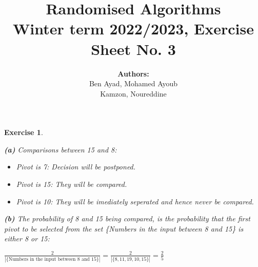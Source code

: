 \documentclass{article}
\title{Randomised Algorithms \\
Winter term 2022/2023, Exercise Sheet No. 3}
\author{
    \textbf{Authors:} \\
    Ben Ayad, Mohamed Ayoub \\
    Kamzon, Noureddine
}
\newtheorem{exo}{Exercise}
\begin{document}
\maketitle


\begin{exo}{\ \\}

\noindent
\textbf{(a)} Comparisons between 15 and 8:
\begin{itemize}
    \item Pivot is 7: Decision will be postponed.
    \item Pivot is 15: They will be compared.
    \item Pivot is 10: They will be imediately seperated and hence never be compared.
\end{itemize}
   
\noindent
\textbf{(b)} The probability of 8 and 15 being compared, is the probability that the first pivot to be selected from the set \{Numbers in the input between 8 and 15\} is either 8 or 15:

$\frac{2}{|\{\text{Numbers in the input between $8$ and $15$}\}|} = \frac{2}{|\{8,11,19,10,15\}|} = \frac{2}{5}  $


\end{exo}
\end{document}
